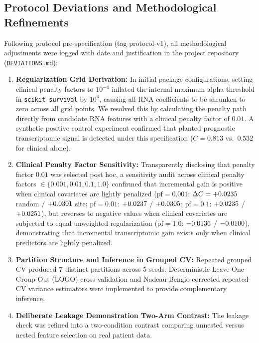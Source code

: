 \documentclass{article}
\begin{document}
\subsection{Protocol Deviations and Methodological Refinements}
Following protocol pre-specification (tag protocol-v1), all methodological adjustments were logged with date and justification in the project repository (\texttt{DEVIATIONS.md}):
\begin{enumerate}
    \item \textbf{Regularization Grid Derivation:} In initial package configurations, setting clinical penalty factors to $10^{-4}$ inflated the internal maximum alpha threshold in \texttt{scikit-survival} by $10^4$, causing all RNA coefficients to be shrunken to zero across all grid points. We resolved this by calculating the penalty path directly from candidate RNA features with a clinical penalty factor of $0.01$. A synthetic positive control experiment confirmed that planted prognostic transcriptomic signal is detected under this specification ($C = 0.813$ vs.\ $0.532$ for clinical alone).
    \item \textbf{Clinical Penalty Factor Sensitivity:} Transparently disclosing that penalty factor $0.01$ was selected post hoc, a sensitivity audit across clinical penalty factors $\in \{0.001, 0.01, 0.1, 1.0\}$ confirmed that incremental gain is positive when clinical covariates are lightly penalized ($\text{pf}=0.001$: $\Delta C = +0.0235$ random / $+0.0301$ site; $\text{pf}=0.01$: $+0.0237$ / $+0.0305$; $\text{pf}=0.1$: $+0.0235$ / $+0.0251$), but reverses to negative values when clinical covariates are subjected to equal unweighted regularization ($\text{pf}=1.0$: $-0.0136$ / $-0.0100$), demonstrating that incremental transcriptomic gain exists only when clinical predictors are lightly penalized.
    \item \textbf{Partition Structure and Inference in Grouped CV:} Repeated grouped CV produced $7$ distinct partitions across 5 seeds. Deterministic Leave-One-Group-Out (LOGO) cross-validation and Nadeau-Bengio corrected repeated-CV variance estimators were implemented to provide complementary inference.
    \item \textbf{Deliberate Leakage Demonstration Two-Arm Contrast:} The leakage check was refined into a two-condition contrast comparing unnested versus nested feature selection on real patient data.
\end{enumerate}
\end{document}
